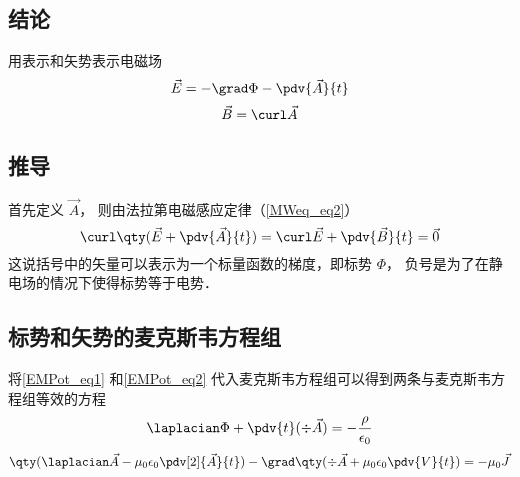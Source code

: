 \subsection{结论}
用表示和矢势表示电磁场
\begin{equation}\label{EMPot_eq1}
\vec E = -\grad \Phi - \pdv{\vec A}{t}
\end{equation}
\begin{equation}\label{EMPot_eq2}
\vec B = \curl \vec A
\end{equation}

\subsection{推导}
首先定义 $\vec A$， 则由法拉第电磁感应定律（\autoref{MWeq_eq2}）
\begin{equation}
\curl \qty(\vec E + \pdv{\vec A}{t}) = \curl \vec E + \pdv{\vec B}{t} = \vec 0
\end{equation}
这说括号中的矢量可以表示为一个标量函数的梯度，即标势 $\Phi$， 负号是为了在静电场的情况下使得标势等于电势．

\subsection{标势和矢势的麦克斯韦方程组}

将\autoref{EMPot_eq1} 和\autoref{EMPot_eq2} 代入麦克斯韦方程组可以得到两条与麦克斯韦方程组等效的方程
\begin{equation}\label{EMPot_eq4}
\laplacian \Phi + \pdv{t} (\div \vec A) = -\frac{\rho}{\epsilon_0}
\end{equation}
\begin{equation}\label{EMPot_eq5}
\qty(\laplacian \vec A - \mu_0\epsilon_0 \pdv[2]{\vec A}{t}) - \grad \qty(\div \vec A + \mu_0\epsilon_0 \pdv{V}{t}) = -\mu_0\vec J
\end{equation}

